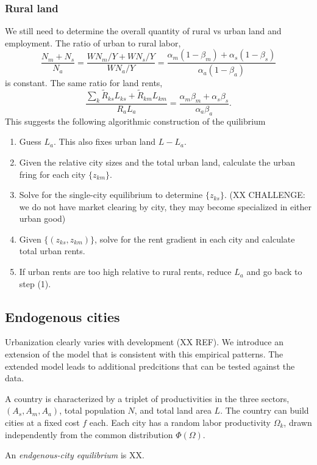 \documentclass[12pt]{article}
\begin{document}
\subsubsection{Rural land}
We still need to determine the overall quantity of rural vs urban land and employment. The ratio of urban to rural labor,
\[
\frac{N_m+N_s}{N_a} =
\frac{WN_m/Y+WN_s/Y}{WN_a/Y} = 
\frac{\alpha_m(1-\beta_m)+\alpha_s(1-\beta_s)}{\alpha_a(1-\beta_a)}
\]
is constant. The same ratio for land rents,
\[
\frac{\sum_k \tilde R_{ks}L_{ks}+\tilde R_{km}L_{km}}
{R_aL_a} = 
\frac{\alpha_m\beta_m+\alpha_s\beta_s}{\alpha_a\beta_a}.
\]
This suggests the following algorithmic construction of the quilibrium
\begin{enumerate}
\item Guess $L_a$. This also fixes urban land $L-L_a$.
\item Given the relative city sizes and the total urban land, calculate the urban fring for each city $\{z_{km}\}$.
\item Solve for the single-city equilibrium to determine $\{z_{ks}\}$. (XX CHALLENGE: we do not have market clearing by city, they may become specialized in either urban good)
\item Given $\{(z_{ks}, z_{km})\}$, solve for the rent gradient in each city and calculate total urban rents.
\item If urban rents are too high relative to rural rents, reduce $L_a$ and go back to step (1). 
\end{enumerate}
\subsection{Endogenous cities}
Urbanization clearly varies with development (XX REF). We introduce an extension of the model that is consistent with this empirical patterns. The extended model leads to additional predcitions that can be tested against the data.

A country is characterized by a triplet of productivities in the three sectors, $(A_s, A_m, A_a)$, total population $N$, and total land area $L$. The country can build cities at a fixed cost $f$ each. Each city has a random labor productivity $\Omega_k$, drawn independently from the common distribution $\Phi(\Omega)$.

An \emph{endgenous-city equilibrium} is XX.
\end{document}

